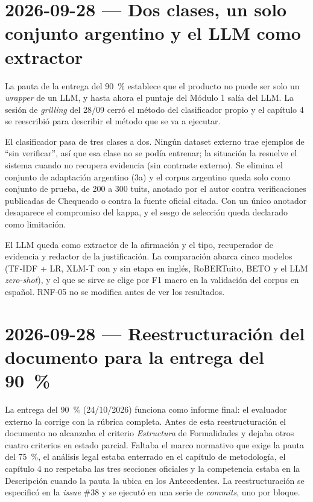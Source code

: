 \section{2026-09-28 — Dos clases, un solo conjunto argentino y el LLM como extractor}

La pauta de la entrega del 90~\% establece que el producto no puede ser solo un \textit{wrapper} de un LLM, y hasta ahora el puntaje del Módulo 1 salía del LLM. La sesión de \textit{grilling} del 28/09 cerró el método del clasificador propio y el capítulo 4 se reescribió para describir el método que se va a ejecutar.

El clasificador pasa de tres clases a dos. Ningún dataset externo trae ejemplos de \enquote{sin verificar}, así que esa clase no se podía entrenar; la situación la resuelve el sistema cuando no recupera evidencia (sin contraste externo). Se elimina el conjunto de adaptación argentino (3a) y el corpus argentino queda solo como conjunto de prueba, de 200 a 300 tuits, anotado por el autor contra verificaciones publicadas de Chequeado o contra la fuente oficial citada. Con un único anotador desaparece el compromiso del kappa, y el sesgo de selección queda declarado como limitación.

El LLM queda como extractor de la afirmación y el tipo, recuperador de evidencia y redactor de la justificación. La comparación abarca cinco modelos (TF-IDF + LR, XLM-T con y sin etapa en inglés, RoBERTuito, BETO y el LLM \textit{zero-shot}), y el que se sirve se elige por F1 macro en la validación del corpus en español. RNF-05 no se modifica antes de ver los resultados.

\bigskip

\section{2026-09-28 — Reestructuración del documento para la entrega del 90~\%}

La entrega del 90~\% (24/10/2026) funciona como informe final: el evaluador externo la corrige con la rúbrica completa. Antes de esta reestructuración el documento no alcanzaba el criterio \emph{Estructura} de Formalidades y dejaba otros cuatro criterios en estado parcial. Faltaba el marco normativo que exige la pauta del 75~\%, el análisis legal estaba enterrado en el capítulo de metodología, el capítulo 4 no respetaba las tres secciones oficiales y la competencia estaba en la Descripción cuando la pauta la ubica en los Antecedentes. La reestructuración se especificó en la \emph{issue} \#38 y se ejecutó en una serie de \emph{commits}, uno por bloque.

